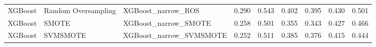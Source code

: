 \begin{tabular}{lllllllll}
                     XGBoost & Random Oversampling &                           XGBoost\_narrow\_ROS & 0.290 &                     0.543 &                 0.402 &                  0.395 &                                   0.430 &     0.501 \\
                     XGBoost &               SMOTE &                         XGBoost\_narrow\_SMOTE & 0.258 &                     0.501 &                 0.355 &                  0.343 &                                   0.427 &     0.466 \\
                     XGBoost &            SVMSMOTE &                      XGBoost\_narrow\_SVMSMOTE & 0.252 &                     0.511 &                 0.385 &                  0.376 &                                   0.415 &     0.444 \\
\bottomrule
\end{tabular}
